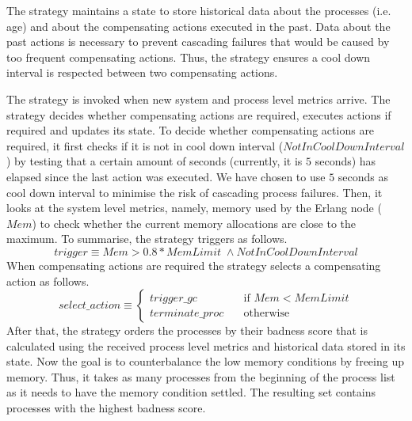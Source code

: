 \documentclass{llncs}
\begin{document}
The strategy maintains a state to store historical data about the processes (i.e. age) and about the compensating actions executed in the past. Data about the past actions is necessary to prevent cascading failures that would be caused by too frequent compensating actions. Thus, the strategy ensures a cool down interval is respected between two compensating actions.

The strategy is invoked when new system and process level metrics arrive. The strategy decides whether compensating actions are required, executes actions if required and updates its state. To decide whether compensating actions are required, it first checks if it is not in cool down interval ($\mathit{NotInCoolDownInterval}$) by testing that a certain amount of seconds (currently, it is $5$ seconds) has elapsed since the last action was executed. We have chosen to use $5$ seconds as cool down interval to minimise the risk of cascading process failures. Then, it looks at the system level metrics, namely,  memory used by the Erlang node ($\mathit{Mem}$) to check whether the current memory allocations are close to the maximum. To summarise, the strategy triggers as follows.
$$
\mathit{trigger}  \equiv \mathit{Mem} > 0.8 * \mathit{MemLimit}  \;\wedge \mathit{NotInCoolDownInterval}
$$
When compensating actions are required the strategy selects a compensating action as follows.
$$
\mathit{select\_action}  \equiv \begin{cases}
    \mathit{trigger\_gc}       & \quad \text{if } \mathit{Mem} < \mathit{MemLimit} \\
    \mathit{terminate\_proc}  & \quad \text{otherwise}
  \end{cases}
$$
After that, the strategy orders the processes by their badness score that is calculated using the received process level metrics and historical data stored in its state. Now the goal is to counterbalance the low memory conditions by freeing up memory. Thus, it takes as many processes from the beginning of the process list as it needs to have the memory condition settled. The resulting set contains processes with the highest badness score. 
\end{document}

